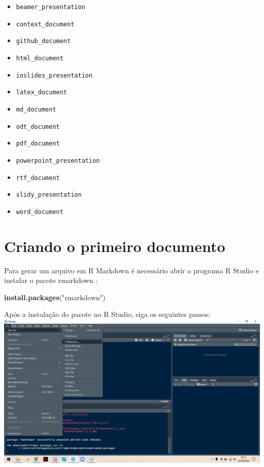 \documentclass[
]{book}
\newenvironment{Shaded}{\begin{snugshade}}{\end{snugshade}}
\newcommand{\KeywordTok}[1]{\textcolor[rgb]{0.13,0.29,0.53}{\textbf{#1}}}
\newcommand{\NormalTok}[1]{#1}
\newcommand{\StringTok}[1]{\textcolor[rgb]{0.31,0.60,0.02}{#1}}
\providecommand{\tightlist}{%
  \setlength{\itemsep}{0pt}\setlength{\parskip}{0pt}}
\begin{document}
\begin{itemize}
\tightlist
\item
  \texttt{beamer\_presentation}
\item
  \texttt{context\_document}
\item
  \texttt{github\_document}
\item
  \texttt{html\_document}
\item
  \texttt{ioslides\_presentation}
\item
  \texttt{latex\_document}
\item
  \texttt{md\_document}
\item
  \texttt{odt\_document}
\item
  \texttt{pdf\_document}
\item
  \texttt{powerpoint\_presentation}
\item
  \texttt{rtf\_document}
\item
  \texttt{slidy\_presentation}
\item
  \texttt{word\_document}
\end{itemize}

\hypertarget{criando-o-primeiro-documento}{%
\section{Criando o primeiro documento}\label{criando-o-primeiro-documento}}

Para gerar um arquivo em R Markdown é necessário abrir o programa R Studio e instalar o pacote rmarkdown :

\begin{Shaded}
\begin{Highlighting}[]
\KeywordTok{install.packages}\NormalTok{(}\StringTok{"rmarkdown"}\NormalTok{)}
\end{Highlighting}
\end{Shaded}

Após a instalação do pacote no R Studio, siga os seguintes passos:
\includegraphics{img/new.png}
\end{document}
